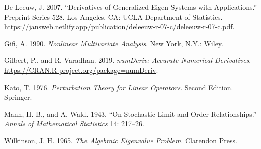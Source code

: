 \documentclass[
  12pt,
  letterpaper,
  DIV=11,
  numbers=noendperiod]{scrartcl}
\newlength{\cslhangindent}
\newenvironment{CSLReferences}[2] %
 {\begin{list}{}{%
  \setlength{\itemindent}{0pt}
  \setlength{\leftmargin}{0pt}
  \setlength{\parsep}{0pt}
  \ifodd #1
   \setlength{\leftmargin}{\cslhangindent}
   \setlength{\itemindent}{-1\cslhangindent}
  \fi
  \setlength{\itemsep}{#2\baselineskip}}}
 {\end{list}}
\begin{document}
\label{refs}
\begin{CSLReferences}{1}{0}
De Leeuw, J. 2007. {``Derivatives of Generalized Eigen Systems with
Applications.''} Preprint Series 528. Los Angeles, CA: UCLA Department
of Statistics.
\url{https://jansweb.netlify.app/publication/deleeuw-r-07-c/deleeuw-r-07-c.pdf}.

Gifi, A. 1990. \emph{Nonlinear Multivariate Analysis}. New York, N.Y.:
Wiley.

Gilbert, P., and R. Varadhan. 2019. \emph{{numDeriv: Accurate Numerical
Derivatives}}. \url{https://CRAN.R-project.org/package=numDeriv}.

Kato, T. 1976. \emph{Perturbation Theory for Linear Operators}. Second
Edition. Springer.

Mann, H. B., and A. Wald. 1943. {``{On Stochastic Limit and Order
Relationships}.''} \emph{Annals of Mathematical Statistics} 14: 217--26.

Wilkinson, J. H. 1965. \emph{{The Algebraic Eigenvalue Problem}}.
Clarendon Press.

\end{CSLReferences}
\end{document}
